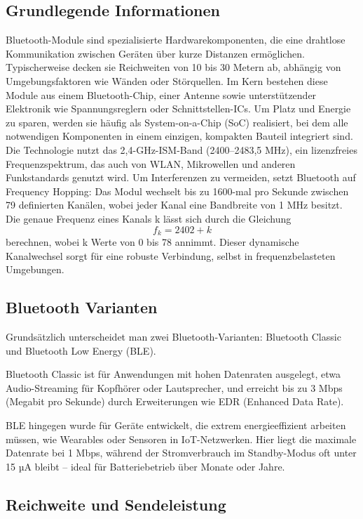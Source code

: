 \subsection{Grundlegende Informationen}
Bluetooth-Module sind spezialisierte Hardwarekomponenten, die eine drahtlose Kommunikation zwischen Geräten über kurze Distanzen ermöglichen. Typischerweise decken sie Reichweiten von 10 bis 30 Metern ab, abhängig von Umgebungsfaktoren wie Wänden oder Störquellen. Im Kern bestehen diese Module aus einem Bluetooth-Chip, einer Antenne sowie unterstützender Elektronik wie Spannungsreglern oder Schnittstellen-ICs. Um Platz und Energie zu sparen, werden sie häufig als System-on-a-Chip (SoC) realisiert, bei dem alle notwendigen Komponenten in einem einzigen, kompakten Bauteil integriert sind.
Die Technologie nutzt das 2,4-GHz-ISM-Band (2400–2483,5 MHz), ein lizenzfreies Frequenzspektrum, das auch von WLAN, Mikrowellen und anderen Funkstandards genutzt wird. Um Interferenzen zu vermeiden, setzt Bluetooth auf Frequency Hopping: Das Modul wechselt bis zu 1600-mal pro Sekunde zwischen 79 definierten Kanälen, wobei jeder Kanal eine Bandbreite von 1 MHz besitzt. Die genaue Frequenz eines Kanals k lässt sich durch die Gleichung 
\begin{equation}
f_k =2402+k  
\end{equation}
berechnen, wobei k Werte von 0 bis 78 annimmt. Dieser dynamische Kanalwechsel sorgt für eine robuste Verbindung, selbst in frequenzbelasteten Umgebungen.

\subsection*{Bluetooth Varianten}

Grundsätzlich unterscheidet man zwei Bluetooth-Varianten: 
Bluetooth Classic und Bluetooth Low Energy (BLE).

Bluetooth Classic ist für Anwendungen mit hohen Datenraten ausgelegt, etwa Audio-Streaming für Kopfhörer oder Lautsprecher, und erreicht bis zu 3 Mbps (Megabit pro Sekunde) durch Erweiterungen wie EDR (Enhanced Data Rate).

BLE hingegen wurde für Geräte entwickelt, die extrem energieeffizient arbeiten müssen, wie Wearables oder Sensoren in IoT-Netzwerken. Hier liegt die maximale Datenrate bei 1 Mbps, während der Stromverbrauch im Standby-Modus oft unter 15 µA bleibt – ideal für Batteriebetrieb über Monate oder Jahre.

\subsection*{Reichweite und Sendeleistung}

